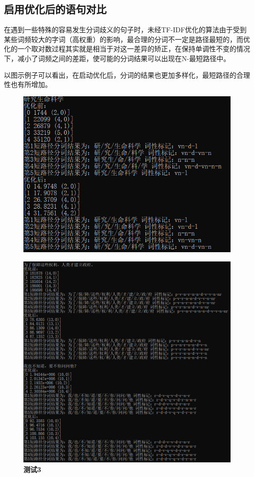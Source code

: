 \documentclass[UTF8]{ctexart}
\begin{document}
\subsection{启用优化后的语句对比}
在遇到一些特殊的容易发生分词歧义的句子时，未经TF-IDF优化的算法由于受到某些词频较大的字词（高权重）的影响，最合理的分词不一定是路径最短的，而优化的一个取对数过程其实就是相当于对这一差异的矫正，在保持单调性不变的情况下，减小了词频之间的差距，使可能的分词结果可以出现在N-最短路径中。\par
以图示例子可以看出，在启动优化后，分词的结果也更加多样化，最短路径的合理性也有所增加。
\begin{figure}[H]
\centerline{
\includegraphics[scale = .6]{test3.png}
}
\end{figure}
\begin{figure}[H]
\centerline{
\includegraphics[scale = .5]{test3-3.png}
}
\caption{\textbf{测试3}}
\end{figure}
\newpage
\end{document}
